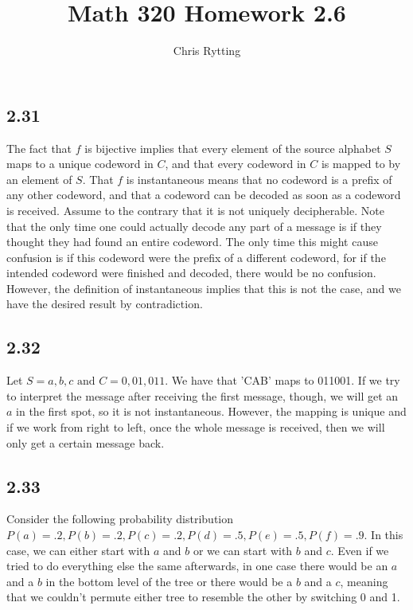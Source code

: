 \documentclass[letterpaper,12pt]{article}
\theoremstyle{definition}
\begin{document}
\title{Math 320 Homework 2.6}
\author{Chris Rytting}
\maketitle

\subsection*{2.31}


The fact that $f$ is bijective implies that every element of the source alphabet $S$ maps to a unique codeword in $C$, and that every codeword in $C$ is mapped to by an element of $S$. That $f$ is instantaneous means that no codeword is a prefix of any other codeword, and that a codeword can be decoded as soon as a codeword is received. 
Assume to the contrary that it is not uniquely decipherable. Note that the only time one could actually decode any part of a message is if they thought they had found an entire codeword. The only time this might cause confusion is if this codeword were the prefix of a different codeword, for if the intended codeword were finished and decoded, there would be no confusion. However, the definition of instantaneous implies that this is not the case, and we have the desired result by contradiction. 

\subsection*{2.32}
Let $S = {a,b,c} \text{ and  } C = {0,01,011}$. We have that 'CAB' maps to 011001. If we try to interpret the message after receiving the first message, though, we will get an $a$ in the first spot, so it is not instantaneous. However, the mapping is unique and if we work from right to left, once the whole message is received, then we will only get a certain message back.

\subsection*{2.33}
Consider the following probability distribution $P(a) = .2, P(b) = .2, P(c) = .2, P(d) = .5, P(e) = .5,P(f) = .9$. In this case, we can either start with $a$ and $b$ or we can start with $b$ and $c$. Even if we tried to do everything else the same afterwards, in one case there would be an $a$ and a $b$ in the bottom level of the tree or there would be a $b$ and a $c$, meaning that we couldn't permute either tree to resemble the other by switching 0 and 1.
\end{document}
